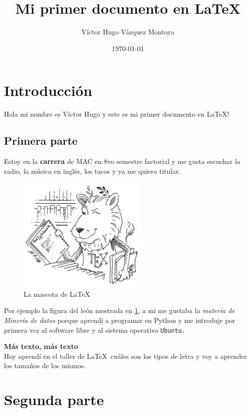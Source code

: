 \documentclass{article}
\title{Mi primer documento en \LaTeX}
\author{Víctor Hugo Vázquez Montoya}
\date{\small{\today}}
\begin{document}
\maketitle
\tableofcontents
\section{Introducción}
Hola mi nombre es Víctor Hugo y este es mi primer documento en \LaTeX!
\subsection{Primera parte}
Estoy en la \textbf{carrera} de \small{MAC} en {\Large 8vo semestre} factorial y me gusta escuchar la radio, la música en {\large inglés}, los tacos y ya me quiero titular.
\begin{figure}[H]
    \centering
    \includegraphics[scale=0.4]{latex_lion.jpeg}
    \caption{La mascota de \LaTeX}
    \label{fig:my_label}
\end{figure}
Por ejemplo la figura del león mostrada en \ref{fig:my_label}, a mi me gustaba la \textit{materia de Minería de datos} porque aprendí a programar en {\tiny Python} y me introduje por primera vez al software libre y al sistema operativo \texttt{Ubuntu.}
\vspace{5mm}

{\textbf{\Huge Más texto, más texto}}\\
{\normalsize Hoy aprendí en el taller de \LaTeX\,} cuáles son los tipos de letra y voy a aprender los {\footnotesize tamaños} de los mismos.
\section{Segunda parte}%
\end{document}
